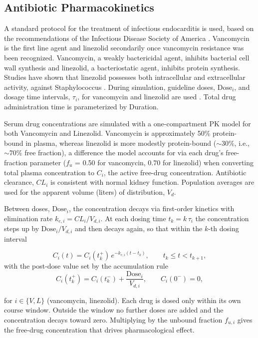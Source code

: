 \documentclass[utf8]{FrontiersinHarvard} %
\begin{document}
\subsection{Antibiotic Pharmacokinetics}
A standard protocol for the treatment of infectious endocarditis is used, based on the recommendations
of the Infectious Disease Society of America \citep{Minter2023}.
Vancomycin is the first line agent and linezolid secondarily once vancomycin resistance was been recognized.
Vancomycin, a weakly bactericidal agent, inhibits bacterial cell wall synthesis and linezolid, a bacteriostatic agent,
inhibits protein synthesis. Studies have shown that linezolid possesses both intracellular and extracellular activity, against Staphylococcus \citep{sandberg2010intra}.
During simulation, guideline doses, $\mathrm{Dose}_{i}$, and dosage time intervals, $\tau_{i}$, for vancomycin and linezolid are used \citep{vancopk_review}.  Total drug administration time is parameterized by Duration.

Serum drug concentrations are simulated with a one-compartment PK model for both Vancomycin and Linezolid.
Vancomycin is approximately 50\% protein-bound in plasma, whereas linezolid is more modestly protein-bound ($\sim$30\%, i.e., $\sim$70\% free fraction), a difference the model accounts for via each drug's free-fraction parameter ($f_u$ = 0.50 for vancomycin, 0.70 for linezolid) when converting total plasma concentration to $C_{i}$, the active free-drug concentration.  Antibiotic clearance, $CL_{i}$ is consistent with normal kidney function. Population averages are used for the apparent volume (liters) of distribution, $V_{d}$.

Between doses, $\mathrm{Dose}_{i}$, the concentration decays via first-order kinetics with elimination rate $k_{e,i} = CL_i / V_{d,i}$. At each dosing time $t_k = k\,\tau_i$ the concentration steps up by $\mathrm{Dose}_i / V_{d,i}$ and then decays again,
so that within the $k$-th dosing interval

\begin{equation}
C_i(t) = C_i(t_k^{+})\, e^{-k_{e,i}(t - t_k)},
\qquad t_k \le t < t_{k+1},
\label{eq:pk}
\end{equation}
with the post-dose value set by the accumulation rule
\begin{equation}
C_i(t_k^{+}) = C_i(t_k^{-}) + \frac{\mathrm{Dose}_i}{V_{d,i}},
\qquad C_i(0^{-}) = 0 ,
\label{eq:pkdose}
\end{equation}

for $i \in \{V, L\}$ (vancomycin, linezolid). Each drug is dosed only within
its own course window. Outside the window no further doses are added and the
concentration decays toward zero. Multiplying by the unbound fraction
$f_{u,i}$ gives the free-drug concentration that drives pharmacological effect.
\end{document}
